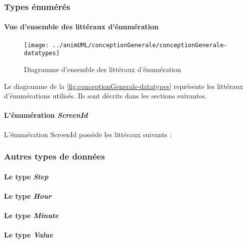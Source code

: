 \subsubsection{Types énumérés}
\paragraph{Vue d'ensemble des littéraux d'énumération}

\begin{figure}[H]
	\centering
	\texttt{[image: ../animUML/conceptionGenerale/conceptionGenerale-datatypes]}
	\caption{Diagramme d'ensemble des littéraux d'énumération}
	\label{fig:conceptionGenerale-datatypes}
\end{figure}
Le diagramme de la \autoref{fig:conceptionGenerale-datatypes} représente les littéraux d'énumérations utilisés. Ils sont décrits dans les sections suivantes.

\paragraph{L'énumération \emph{ScreenId}}
L'énumération ScreenId possède les littéraux suivants :
\enumScreenIdLiteralDescriptions


\subsubsection{Autres types de données}
\paragraph{Le type \emph{Step}}


\paragraph{Le type \emph{Hour}}


\paragraph{Le type \emph{Minute}}


\paragraph{Le type \emph{Value}}


